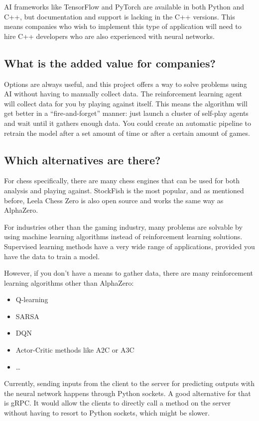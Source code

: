 \documentclass{article}
\begin{document}
AI frameworks like TensorFlow and PyTorch are available in both Python and C++, 
but documentation and support is lacking in the C++ versions. This means companies 
who wish to implement this type of application will need to hire C++ developers who
are also experienced with neural networks.

\subsection{What is the added value for companies?}

Options are always useful, and this project offers a way to solve problems 
using AI without having to manually collect data. The reinforcement learning agent 
will collect data for you by playing against itself. This means the algorithm will
get better in a ``fire-and-forget'' manner: just launch a cluster of self-play agents
and wait until it gathers enough data. You could create an automatic pipeline to
retrain the model after a set amount of time or after a certain amount of games.

\subsection{Which alternatives are there?}

For chess specifically, there are many chess engines that can be used for both analysis
and playing against. StockFish is the most popular, and as mentioned before, 
Leela Chess Zero is also open source and works the same way as AlphaZero. 

For industries other than the gaming industry, many problems are solvable by using
machine learning algorithms instead of reinforcement learning solutions. 
Supervised learning methods have a very wide range of applications, provided 
you have the data to train a model.

However, if you don't have a means to gather data, there are many reinforcement
learning algorithms other than AlphaZero:

\begin{itemize}
    \item Q-learning
    \item SARSA
    \item DQN
    \item Actor-Critic methods like A2C or A3C
    \item \dots
\end{itemize}

Currently, sending inputs from the client to the server for predicting outputs with 
the neural network happens through Python sockets. A good alternative for that is gRPC. 
It would allow the clients to directly call a method on the server without having to 
resort to Python sockets, which might be slower. \cite{IntroductionGRPC}
\end{document}
